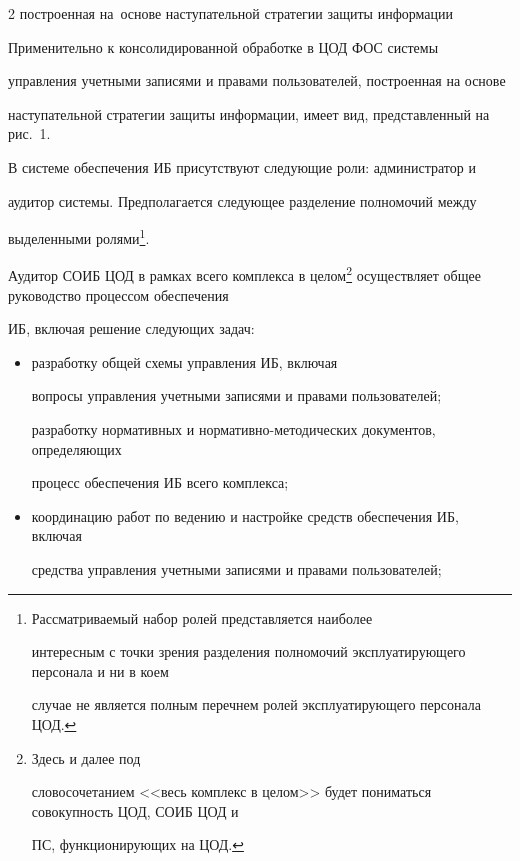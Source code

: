 \begin{multicols}{2}
{построенная на~основе наступательной стратегии защиты информации}


       


       Применительно к консолидированной обработке в ЦОД ФОС сис\-те\-мы 


управления учетными записями и правами пользователей, построенная на основе 


наступательной стратегии защиты информации, имеет вид, представленный на рис.~1. 


       


       


       В системе обеспечения ИБ присутствуют следующие роли: администратор и 


аудитор сис\-те\-мы. Предполагается следующее разделение полномочий между 


выделенными ролями\footnote{Рассматриваемый набор ролей представляется наиболее 


интересным с точки зрения разделения полномочий эксплуатирующего персонала и ни в коем 


случае не является полным перечнем ролей эксплуатирующего персонала ЦОД.}.


       


       Аудитор СОИБ ЦОД в рамках всего комплекса в целом\footnote[2]{Здесь и далее под 


словосочетанием <<весь комплекс в целом>> будет пониматься совокупность ЦОД, СОИБ ЦОД и 


ПС, функционирующих на ЦОД.} осуществляет общее руководство процессом обеспечения 


ИБ, включая решение следующих задач:


       \begin{itemize}


\item разработку общей схемы управления ИБ, включая 


вопросы управления учетными записями и правами пользователей;


разработку нормативных и нор\-ма\-тив\-но-ме\-то\-ди\-че\-ских документов, определяющих 


процесс обеспечения ИБ всего комплекса;


\item координацию работ по ведению и настройке средств обеспечения ИБ, включая 


средства управления учетными записями и правами пользователей;



\end{itemize}
\end{multicols}
